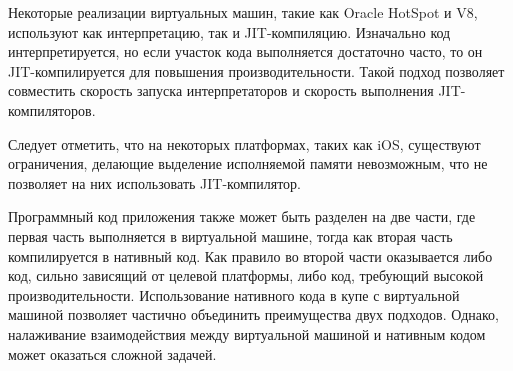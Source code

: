 Некоторые реализации виртуальных машин, такие как Oracle HotSpot и V8, используют как интерпретацию, так и JIT-компиляцию. 
Изначально код интерпретируется, но если участок кода выполняется достаточно часто, то он JIT-компилируется для повышения производительности. 
Такой подход позволяет совместить скорость запуска интерпретаторов и скорость выполнения JIT-компиляторов.

Следует отметить, что на некоторых платформах, таких как iOS, существуют ограничения, делающие выделение исполняемой памяти невозможным, что не позволяет на них использовать JIT-компилятор. \cite{IOSJIT}

Программный код приложения также может быть разделен на две части, где первая часть выполняется в виртуальной машине, тогда как вторая часть компилируется в нативный код. 
Как правило во второй части оказывается либо код, сильно зависящий от целевой платформы, либо код, требующий высокой производительности.
Использование нативного кода в купе с виртуальной машиной позволяет частично объединить преимущества двух подходов. 
Однако, налаживание взаимодействия между виртуальной машиной и нативным кодом может оказаться сложной задачей.
